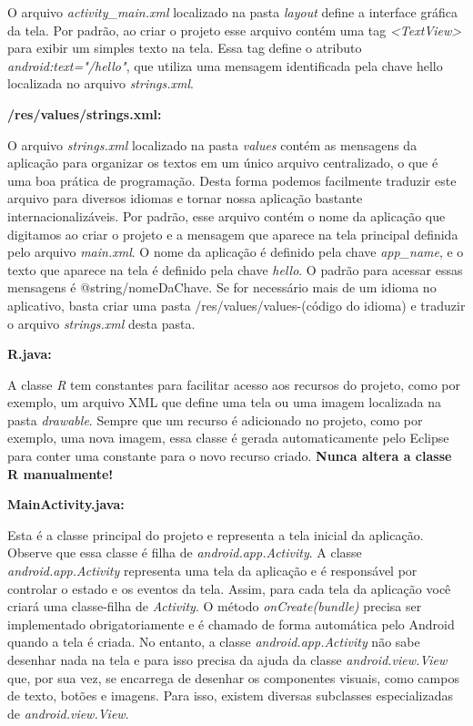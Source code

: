 \documentclass[a4paper,12pt,brazil,oneside]{book}
\begin{document}
\begin{singlespace}
O arquivo \emph{activity\_main.xml} localizado na pasta \emph{layout} define a interface gráfica da tela. Por padrão, ao criar o projeto esse arquivo contém uma tag \emph{<TextView>} para exibir um simples texto na tela. Essa tag define o atributo \emph{android:text="\@string/hello"}, que utiliza uma mensagem identificada pela chave hello localizada no arquivo \emph{strings.xml}.

\textbf{/res/values/strings.xml:}

O arquivo \emph{strings.xml} localizado na pasta \emph{values} contém as mensagens da aplicação para organizar os textos em um único arquivo centralizado, o que é uma boa prática de programação. Desta forma podemos facilmente traduzir este arquivo para diversos idiomas e tornar nossa aplicação bastante internacionalizáveis.
Por padrão, esse arquivo contém o nome da aplicação que digitamos ao criar o projeto e a mensagem que aparece na tela principal definida pelo arquivo \emph{main.xml}.
O nome da aplicação é definido pela chave \emph{app\_name}, e o texto que aparece na tela é definido pela chave \emph{hello}.  O padrão para acessar essas mensagens é @string/nomeDaChave.
Se for necessário mais de um idioma no aplicativo, basta criar uma pasta /res/values/values-(código do idioma) e traduzir o arquivo \emph{strings.xml} desta pasta.

\textbf{R.java:}

A classe \emph{R} tem constantes para facilitar acesso aos recursos do projeto, como por exemplo, um arquivo XML que define uma tela ou uma imagem localizada na pasta \emph{drawable}.
Sempre que um recurso é adicionado no projeto, como por exemplo, uma nova imagem, essa classe é gerada automaticamente pelo Eclipse para conter uma constante para o novo recurso criado. \textbf{Nunca altera a classe R manualmente!} 

\textbf{MainActivity.java:}

Esta é a classe principal do projeto e representa a tela inicial da aplicação. Observe que essa classe é filha de \emph{android.app.Activity}.
A classe \emph{android.app.Activity} representa uma tela da aplicação e é responsável por controlar o estado e os eventos da tela. Assim, para cada tela da aplicação você criará uma classe-filha de \emph{Activity}. O método \emph{onCreate(bundle)} precisa ser implementado obrigatoriamente e é chamado de forma automática pelo Android quando a tela é criada. No entanto, a classe \emph{android.app.Activity} não sabe desenhar nada na tela e para isso precisa da ajuda da classe \emph{android.view.View} que, por sua vez, se encarrega de desenhar os componentes visuais, como campos de texto, botões e imagens. Para isso, existem diversas subclasses especializadas de \emph{android.view.View}.


\end{singlespace}
\end{document}
